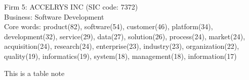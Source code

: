 \documentclass[11pt]{article}
\begin{document}
\begin{table}
\begin{threeparttable}
\begin{tabu}
\midrule
Firm 5: ACCELRYS INC (SIC code: 7372) \\
\midrule 
Business: Software Development \\[0.5ex]
Core words: product(82), software(54), customer(46), platform(34), development(32), service(29), data(27), solution(26), process(24), market(24), acquisition(24), research(24), enterprise(23), industry(23), organization(22), quality(19), informatics(19), system(18), management(18), information(17) \\
\bottomrule
\end{tabu}
\begin{tablenotes}[flushleft]
\linespread{1.3}\footnotesize
\item This is a table note
\end{tablenotes}
\end{threeparttable}
\end{table}




\end{document}
